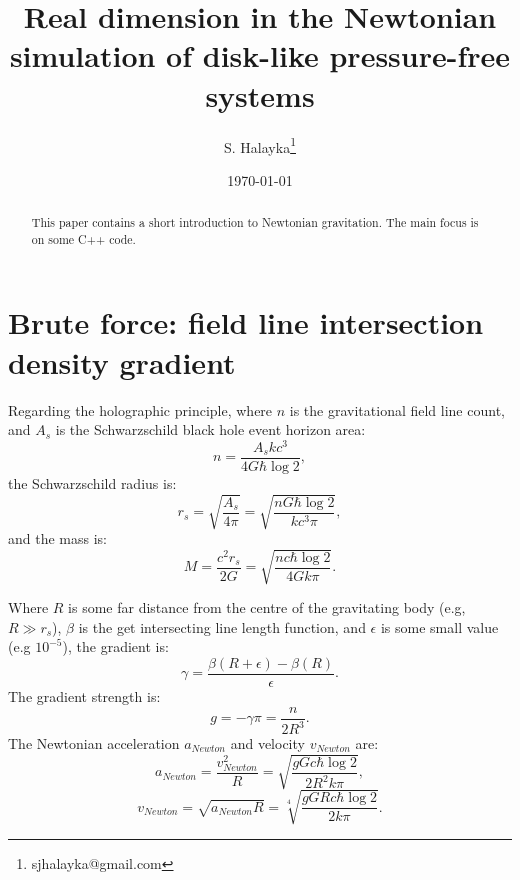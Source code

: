 \documentclass[12pt]{article}
\title{Real dimension in the Newtonian simulation of disk-like pressure-free systems}
\author{S. Halayka\footnote{sjhalayka@gmail.com}}
\date{\today\;\currenttime}
\begin{document}
 
\maketitle

\begin{abstract}
This paper contains a short introduction to Newtonian gravitation.
The main focus is on some C++ code.
\end{abstract}






\section{Brute force: field line intersection density gradient}
Regarding the holographic principle, where $n$ is the gravitational field line count, and $A_s$ is the Schwarzschild black hole event horizon area:
\begin{equation}
n = \frac{A_s k c^3}{ 4 G \hbar \log 2},
\end{equation}
the Schwarzschild radius is:
\begin{equation}
r_s = \sqrt{\frac{A_s}{4 \pi}} = \sqrt{\frac{n G \hbar \log 2}{k c^3 \pi}},
\end{equation}
and the mass is:
\begin{equation}
M = \frac{c^2 r_s}{2 G} = \sqrt{\frac{n c \hbar \log 2}{4 G k \pi}}. 
\end{equation}

Where $R$ is some far distance from the centre of the gravitating body (e.g, $R \gg r_s$), $\beta$ is the get intersecting line length function, and $\epsilon$ is some small value (e.g $10^{-5}$), the gradient is:
\begin{equation}
\gamma = \frac{\beta(R + \epsilon) - \beta(R)}{\epsilon}.
\end{equation}
The gradient strength is:
\begin{equation}
g = -\gamma \pi = \frac{n}{2 R^3}.
\end{equation}
The Newtonian acceleration $a_{\textit{Newton}}$ and velocity $v_{\textit{Newton}}$ are:
\begin{equation}
a_{\textit{Newton}} = \frac{v_{\textit{Newton}}^2}{R} = \sqrt{\frac{g G c \hbar \log 2}{2 R^2 k \pi}},
\end{equation}
\begin{equation}
v_{\textit{Newton}} = \sqrt{a_{\textit{Newton}} R} =\sqrt[4]{\frac{g G R c \hbar \log 2}{2 k \pi}}.
\end{equation}
\end{document}
